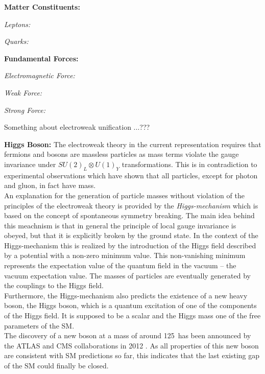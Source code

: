 \begin{description}

\item \textbf{Matter Constituents:}
 \begin{description}
  \item \textit{Leptons:}
  \item \textit{Quarks:}
 \end{description}

\item \textbf{Fundamental Forces:}
 \begin{description}
  \item \textit{Electromagnetic Force:}
  \item \textit{Weak Force:}
  \item \textit{Strong Force:}
 \end{description}
Something about electroweak unification ...???
\item \textbf{Higgs Boson:} The electroweak theory in the current representation requires that fermions and bosons are massless particles as mass terms violate the gauge invariance under $SU(2)_{L} \otimes U(1)_{Y}$ transformations. This is in contradiction to experimental observations which have shown that all particles, except for photon and gluon, in fact have mass. \\
An explanation for the generation of particle masses without violation of the principles of the electroweak theory is provided by the \textit{Higgs-mechanism}  which is based on the concept of spontaneous symmetry breaking. The main idea behind this meachnism is that in general the principle of local gauge invariance is obeyed, but that it is explicitly broken by the ground state. In the context of the Higgs-mechanism this is realized by the introduction of the Higgs field described by a potential with a non-zero minimum value. This non-vanishing minimum represents the expectation value of the quantum field in the vacuum -- the vacuum expectation value. The masses of particles are eventually generated by the couplings to the Higgs field. \\
Furthermore, the Higgs-mechanism also predicts the existence of a new heavy boson, the Higgs boson, which is a quantum excitation of one of the components of the Higgs field. It is supposed to be a scalar and the Higgs mass one of the free parameters of the SM. \\
The discovery of a new boson at a mass of around 125~\gev has been announced by the ATLAS and CMS collaborations in 2012 . As all properties of this new boson are consistent with SM predictions so far, this indicates that the last existing gap of the SM could finally be closed. 
\end{description}


